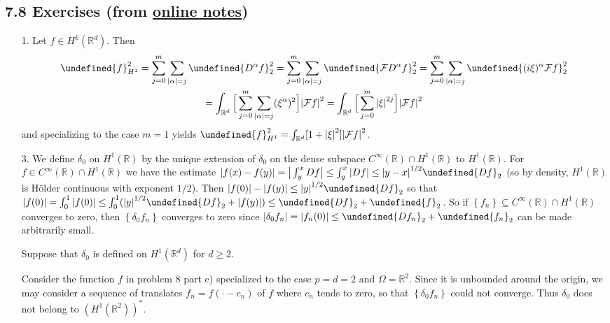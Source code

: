 \documentclass[11pt,leqno]{article}
\theoremstyle{plain}
\theoremstyle{definition}
\numberwithin{equation}{section}
\numberwithin{lem}{section}
\newcommand{\cbr}[1]{\left\{#1\right\}}
\let\norm\undefined %
\DeclarePairedDelimiter\norm{\lVert}{\rVert}
\begin{document}
\subsection*{7.8 Exercises (from \href{https://users.oden.utexas.edu/~arbogast/appMath08c.pdf}{online notes})}
\begin{enumerate}
    \item[1.] Let $f\in H^k(\mathbb R^d)$. Then 
    \begin{multline*}
        \norm{f}_{H^1}^2 = \sum_{j=0}^m\sum_{\abs{\alpha} = j}\norm{D^\alpha f}_2^2 = \sum_{j=0}^m\sum_{\abs{\alpha} = j}\norm{\mathcal FD^\alpha f}_2^2 = \sum_{j=0}^m\sum_{\abs{\alpha} = j}\norm{(i\xi)^\alpha \mathcal F f}_2^2 \\ = \int_{\mathbb R^d}\Big[\sum_{j=0}^m\sum_{\abs{\alpha} = j}(\xi^\alpha)^2\Big]\abs{\mathcal Ff}^2 = \int_{\mathbb R^d}\Big[\sum_{j=0}^m\abs{\xi}^{2j}\Big]\abs{\mathcal Ff}^2
    \end{multline*} and specializing to the case $m = 1$ yields $\norm{f}_{H^1}^2 = \int_{\mathbb R^d}[1+\abs{\xi}^{2}]\abs{\mathcal Ff}^2$.
    \item[3.] We define $\delta_0$ on $H^1(\mathbb R)$ by the unique extension of $\delta_0$ on the dense subspace $C^\infty(\mathbb R)\cap H^1(\mathbb R)$ to $H^1(\mathbb R)$. For $f\in C^\infty(\mathbb R)\cap H^1(\mathbb R)$ we have the estimate $\abs{f(x)-f(y)} = \big|\int_y^xDf\big|\leq \int_y^x\abs{Df}\leq \abs{y-x}^{1/2}\norm{Df}_2$ (so by density, $H^1(\mathbb R)$ is H\"older continuous with exponent $1/2$). Then $\abs{f(0)} - \abs{f(y)}\leq \abs{y}^{1/2}\norm{Df}_2$ so that $\abs{f(0)} = \int_0^1\abs{f(0)}\leq \int_0^1(\abs{y}^{1/2}\norm{Df}_2 + \abs{f(y)})\leq \norm{Df}_2 + \norm{f}_2$. So if $\cbr{f_n}\subseteq C^\infty(\mathbb R)\cap H^1(\mathbb R)$ converges to zero, then $\cbr{\delta_0f_n}$ converges to zero since $\abs{\delta_0f_n} = \abs{f_n(0)}\leq \norm{Df_n}_2 + \norm{f_n}_2$ can be made arbitrarily small.
    
    Suppose that $\delta_0$ is defined on $H^1(\mathbb R^d)$ for $d\geq 2$.
    
    Consider the function $f$ in problem 8 part c) specialized to the case $p = d = 2$ and $\Omega = \mathbb R^2$. Since it is unbounded around the origin, we may consider a sequence of translates $f_n = f(\cdot - c_n)$ of $f$ where $c_n$ tends to zero, so that $\cbr{\delta_0f_n}$ could not converge. Thus $\delta_0$ does not belong to $(H^1(\mathbb R^2))^\ast$.


\end{enumerate}
\end{document}
